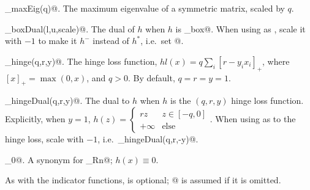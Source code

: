 \documentclass{article}
\newcommand{\<}{\langle}
\renewcommand{\>}{\rangle}
\begin{document}
\begin{trivlist}
\item \verb@prox_maxEig(q)@. The maximum eigenvalue of a symmetric matrix, scaled by $q$.
\item \verb@prox_boxDual(l,u,scale)@. The dual of $h$ when $h$ is \verb@prox_box@. When using as \verb@conjnegF@, scale it with $-1$ to make it $h^{-}$ instead of $h^*$, i.e.~set @.
\item \verb@prox_hinge(q,r,y)@. The hinge loss function, $hl(x)=q \sum_i [ r - y_i x_i ]_{+} $,
    where $[ x ]_{+} = \max( 0, x )$, and $q>0$. By default, $q=r=y=1$.
\item \verb@prox_hingeDual(q,r,y)@. The dual to $h$ when $h$ is the $(q,r,y)$ hinge loss function.
    Explicitly, when $y=1$, \linebreak $h(z) = \begin{cases}r z & z \in [-q,0] \\
        +\infty & \text{else} \end{cases}$.
    When using as \verb@conjnegF@ to the hinge loss, scale with $-1$, i.e.~\verb@prox_hingeDual(q,r,-y)@.
\item \verb@prox_0@. A synonym for \verb@proj_Rn@; $h(x)\equiv 0$.
\end{trivlist}
As with the indicator functions, \verb@s@ is optional; @ is assumed if it is omitted.
\end{document}
